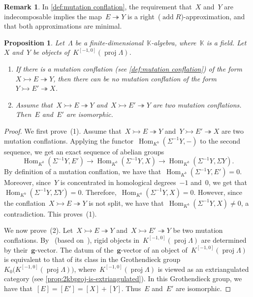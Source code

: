 \documentclass{amsart}
\newtheorem{proposition}[theorem]{Proposition}
\theoremstyle{definition}
\newtheorem{remark}[theorem]{Remark}
\renewcommand{\b}[1]{{\boldsymbol{#1}}} %
\newcommand{\field}{\mathbb{K}}
\newcommand{\Hom}[1]{\operatorname{Hom}_{#1}}
\newcommand{\susp}{\Sigma}
\newcommand{\add}{\operatorname{add}}
\newcommand{\proj}{\operatorname{proj}}
\newcommand{\infl}{\rightarrowtail}
\newcommand{\defl}{\twoheadrightarrow}
\begin{document}
\begin{remark}
In \cref{def:mutation conflation}, the requirement that~$X$ and~$Y$ are indecomposable implies the map~$E\defl Y$ is a right~($\add R$)-approximation, and that both approximations are minimal.
\end{remark}

\begin{proposition}
\label{prop:exchange conflations are unique}
Let~$\Lambda$ be a finite-dimensional~$\field$-algebra, where~$\field$ is a field. Let~$X$ and~$Y$ be objects of~$K^{[-1,0]}(\proj \Lambda)$. 
\begin{enumerate}
\item If there is a mutation conflation (see \cref{def:mutation conflation}) of the form~$X\infl E\defl Y$, then there can be no mutation conflation of the form~$Y\infl E'\defl X$.
\item Assume that~$X\infl E\defl Y$ and~$X\infl E'\defl Y$ are two mutation conflations. 
Then~$E$ and~$E'$ are isomorphic. 
\end{enumerate} 
\end{proposition}

\begin{proof}
We first prove~(1). Assume that~$X\infl E\defl Y$ and~$Y\infl E'\defl X$ are two mutation conflations. Applying the functor~$\Hom{K^b}(\susp^{-1} Y, -)$ to the second sequence, we get an exact sequence of abelian groups
\[
\Hom{K^b}(\susp^{-1} Y, E') \to \Hom{K^b}(\susp^{-1} Y, X) \to \Hom{K^b}(\susp^{-1} Y, \susp Y).
\]
By definition of a mutation conflation, we have that~$\Hom{K^b}(\susp^{-1} Y, E') = 0$. Moreover, since~$Y$ is concentrated in homological degrees~$-1$ and~$0$, we get that~$\Hom{K^b}(\susp^{-1} Y, \susp Y) = 0$. Therefore,~$\Hom{K^b}(\susp^{-1} Y, X) = 0$. 
However, since the conflation~$X\infl E\defl Y$ is not split, we have that~$\Hom{K^b}(\susp^{-1} Y, X) \neq 0$, a contradiction. This proves~(1). 

\smallskip
We now prove~(2). Let~$X\infl E\defl Y$ and~$X\infl E'\defl Y$ be two mutation conflations. By~\cite[Thm.~6.5]{DemonetIyamaJasso} (based on~\cite[Thm~2.3]{DehyKeller}), rigid objects in~$K^{[-1,0]}(\proj \Lambda)$ are determined by their~$\b{g}$-vector. The datum of the~$\b{g}$-vector of an object of~$K^{[-1,0]}(\proj \Lambda)$ is equivalent to that of its class in the Grothendieck group~$K_0 \big( K^{[-1,0]}(\proj \Lambda) \big)$, where~$K^{[-1,0]}(\proj \Lambda)$ is viewed as an extriangulated category (see \cref{prop:2kbproj-is-extriangulated}). In this Grothendieck group, we have that~$[E] = [E'] = [X]+[Y]$. Thus~$E$ and~$E'$ are isomorphic.
\end{proof}
\end{document}
